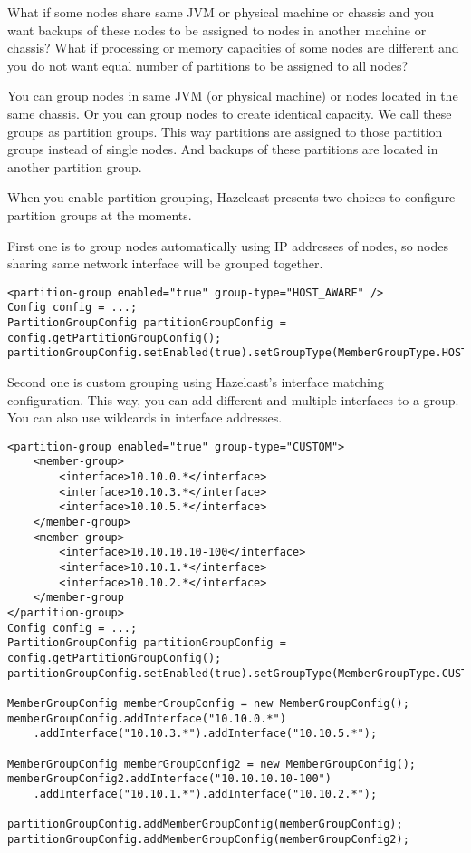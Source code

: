 What if some nodes share same JVM or physical machine or chassis and you want backups of these nodes to be assigned to nodes in another machine or chassis? What if processing or memory capacities of some nodes are different and you do not want equal number of partitions to be assigned to all nodes?

You can group nodes in same JVM (or physical machine) or nodes located in the same chassis. Or you can group nodes to create identical capacity. We call these groups as partition groups. This way partitions are assigned to those partition groups instead of single nodes. And backups of these partitions are located in another partition group.

When you enable partition grouping, Hazelcast presents two choices to configure partition groups at the moments.

First one is to group nodes automatically using IP addresses of nodes, so nodes sharing same network interface will be grouped together.

\begin{verbatim}
<partition-group enabled="true" group-type="HOST_AWARE" />
Config config = ...;
PartitionGroupConfig partitionGroupConfig = config.getPartitionGroupConfig();
partitionGroupConfig.setEnabled(true).setGroupType(MemberGroupType.HOST_AWARE);
\end{verbatim}

Second one is custom grouping using Hazelcast's interface matching configuration. This way, you can add different and multiple interfaces to a group. You can also use wildcards in interface addresses.

\begin{verbatim}
<partition-group enabled="true" group-type="CUSTOM">
    <member-group>
        <interface>10.10.0.*</interface>
        <interface>10.10.3.*</interface>
        <interface>10.10.5.*</interface>
    </member-group>
    <member-group>
        <interface>10.10.10.10-100</interface>
        <interface>10.10.1.*</interface>
        <interface>10.10.2.*</interface>
    </member-group
</partition-group>
Config config = ...;
PartitionGroupConfig partitionGroupConfig = config.getPartitionGroupConfig();
partitionGroupConfig.setEnabled(true).setGroupType(MemberGroupType.CUSTOM);

MemberGroupConfig memberGroupConfig = new MemberGroupConfig();
memberGroupConfig.addInterface("10.10.0.*")
    .addInterface("10.10.3.*").addInterface("10.10.5.*");

MemberGroupConfig memberGroupConfig2 = new MemberGroupConfig();
memberGroupConfig2.addInterface("10.10.10.10-100")
    .addInterface("10.10.1.*").addInterface("10.10.2.*");

partitionGroupConfig.addMemberGroupConfig(memberGroupConfig);
partitionGroupConfig.addMemberGroupConfig(memberGroupConfig2);
\end{verbatim}

